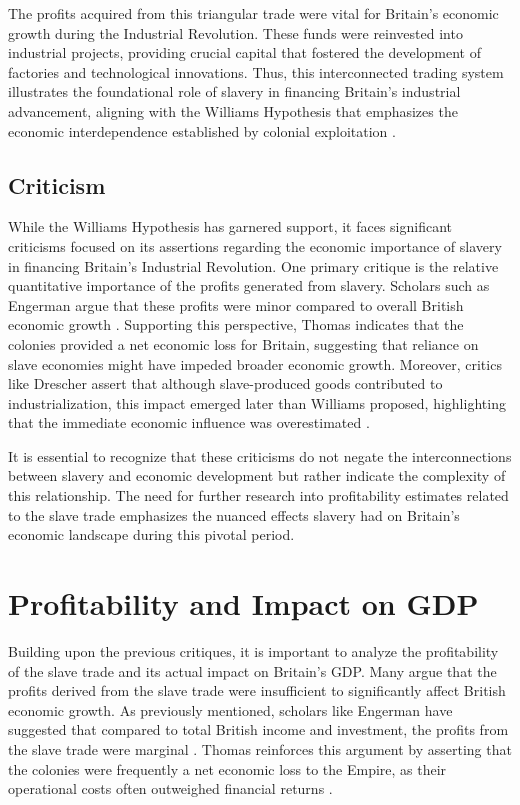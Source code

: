 \documentclass[a4paper,11pt]{article}
\begin{document}
The profits acquired from this triangular trade were vital for Britain's economic growth during the Industrial Revolution. These funds were reinvested into industrial projects, providing crucial capital that fostered the development of factories and technological innovations. Thus, this interconnected trading system illustrates the foundational role of slavery in financing Britain's industrial advancement, aligning with the Williams Hypothesis that emphasizes the economic interdependence established by colonial exploitation \citep{solow1985} \citep{drescher1997}.

\subsection{Criticism}

While the Williams Hypothesis has garnered support, it faces significant criticisms focused on its assertions regarding the economic importance of slavery in financing Britain's Industrial Revolution. One primary critique is the relative quantitative importance of the profits generated from slavery. Scholars such as Engerman argue that these profits were minor compared to overall British economic growth \citep{eltisengerman2000}. Supporting this perspective, Thomas indicates that the colonies provided a net economic loss for Britain, suggesting that reliance on slave economies might have impeded broader economic growth. Moreover, critics like Drescher assert that although slave-produced goods contributed to industrialization, this impact emerged later than Williams proposed, highlighting that the immediate economic influence was overestimated \citep{drescher1997}.

It is essential to recognize that these criticisms do not negate the interconnections between slavery and economic development but rather indicate the complexity of this relationship. The need for further research into profitability estimates related to the slave trade emphasizes the nuanced effects slavery had on Britain's economic landscape during this pivotal period.

\section{Profitability and Impact on GDP}

Building upon the previous critiques, it is important to analyze the profitability of the slave trade and its actual impact on Britain's GDP. Many argue that the profits derived from the slave trade were insufficient to significantly affect British economic growth. As previously mentioned, scholars like Engerman have suggested that compared to total British income and investment, the profits from the slave trade were marginal \citep{eltisengerman2000}. Thomas reinforces this argument by asserting that the colonies were frequently a net economic loss to the Empire, as their operational costs often outweighed financial returns \citep{eltisengerman2000}.
\end{document}
